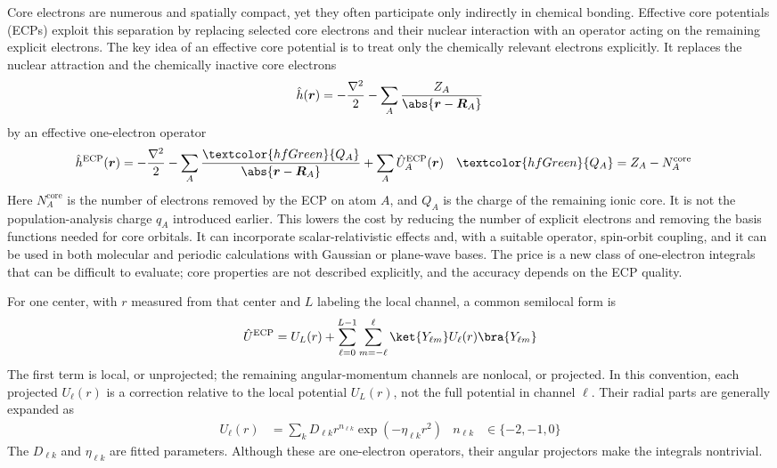 \documentclass[11pt,a4paper,titlepage]{article}
\numberwithin{equation}{section}
\newcommand{\br}{\boldsymbol{r}}
\newcommand{\bR}{\boldsymbol{R}}
\newcommand{\hh}{\Hat{h}}
\newcommand{\green}[1]{\textcolor{hfGreen}{#1}}
\begin{document}
Core electrons are numerous and spatially compact, yet they often participate
only indirectly in chemical bonding. Effective core potentials (ECPs)
exploit this
separation by replacing selected core electrons and their nuclear interaction
with an operator acting on the remaining explicit electrons.
The key idea of an effective core potential \citep{WadtHay1985} is to treat only the chemically
relevant electrons explicitly. It replaces the nuclear attraction and the
chemically inactive core electrons
\begin{equation}
 \hh(\br)=-\frac{\nabla^2}{2}
 -\sum_A\frac{Z_A}{\abs{\br-\bR_A}}
\end{equation}
by an effective one-electron operator
\begin{align}
 \hh^\text{ECP}(\br)&=-\frac{\nabla^2}{2}
 -\sum_A\frac{\green{Q_A}}{\abs{\br-\bR_A}}
 +\sum_A\Hat{U}_A^\text{ECP}(\br)
 &
 \green{Q_A}&=Z_A-N_A^\text{core}
\end{align}
Here $N_A^\text{core}$ is the number of electrons removed by the ECP on atom
$A$, and $Q_A$ is the charge of the remaining ionic core. It is not the
population-analysis charge $q_A$ introduced earlier.
This lowers the cost by reducing the number of explicit electrons and removing
the basis functions needed for core orbitals. It can incorporate
scalar-relativistic effects and, with a suitable operator, spin-orbit
coupling, and it can be used in both molecular and periodic calculations with
Gaussian or plane-wave bases. The price is a new class of one-electron
integrals that can be difficult to evaluate; core properties are not described
explicitly, and the accuracy depends on the ECP quality.

For one center, with $r$ measured from that center and $L$ labeling the local
channel, a common semilocal form is
\begin{equation}
  \Hat{U}^\text{ECP}=U_L(r)+
  \sum_{\ell=0}^{L-1}\sum_{m=-\ell}^{\ell}
  \ket{Y_{\ell m}}U_\ell(r)\bra{Y_{\ell m}}
\end{equation}
The first term is local, or unprojected; the remaining angular-momentum
channels are nonlocal, or projected. In this convention, each projected
$U_\ell(r)$ is a correction relative to the local potential $U_L(r)$, not
the full potential in channel $\ell$. Their radial parts are generally expanded
as
\begin{align}
  U_\ell(r)&=\sum_kD_{\ell k}r^{n_{\ell k}}
  \exp(-\eta_{\ell k}r^2)
  &
  n_{\ell k}&\in\{-2,-1,0\}
\end{align}
The $D_{\ell k}$ and $\eta_{\ell k}$ are fitted parameters. Although these are
one-electron operators, their angular projectors make the integrals nontrivial.
\end{document}
